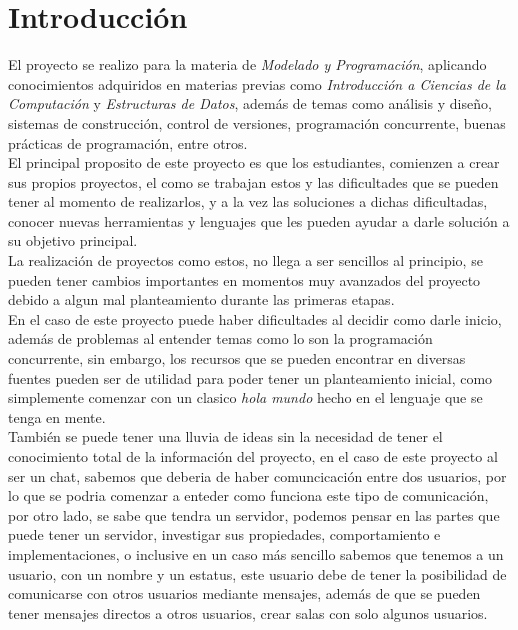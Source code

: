 \documentclass[12pt]{report}
\begin{document}
\chapter{Introducción}
El proyecto se realizo para la materia de \textit{Modelado y Programación}, aplicando conocimientos adquiridos en materias previas como \textit{Introducción a Ciencias de la Computación} y \textit{Estructuras de Datos}, además de temas como análisis y diseño, sistemas de construcción, control de versiones, programación concurrente, buenas prácticas de programación, entre otros.\\

El principal proposito de este proyecto es que los estudiantes, comienzen a crear sus propios proyectos, el como se trabajan estos y las dificultades que se pueden tener al momento de realizarlos, y a la vez las soluciones a dichas dificultadas, conocer nuevas herramientas y lenguajes que les pueden ayudar a darle solución a su objetivo principal.\\

La realización de proyectos como estos, no llega a ser sencillos al principio, se pueden tener cambios importantes en momentos muy avanzados del proyecto debido a algun mal planteamiento durante las primeras etapas.\\

En el caso de este proyecto puede haber dificultades al decidir como darle inicio, además de problemas al entender temas como lo son la programación concurrente, sin embargo, los recursos que se pueden encontrar en diversas fuentes pueden ser de utilidad para poder tener un planteamiento inicial, como simplemente comenzar con un clasico \textit{hola mundo} hecho en el lenguaje que se tenga en mente.\\

También se puede tener una lluvia de ideas sin la necesidad de tener el conocimiento total de la información del proyecto, en el caso de este proyecto al ser un chat, sabemos que deberia de haber comuncicación entre dos usuarios, por lo que se podria comenzar a enteder como funciona este tipo de comunicación, por otro lado, se sabe que tendra un servidor, podemos pensar en las partes que puede tener un servidor, investigar sus propiedades, comportamiento e implementaciones, o inclusive en un caso más sencillo sabemos que tenemos a un usuario, con un nombre y un estatus, este usuario debe de tener la posibilidad de comunicarse con otros usuarios mediante mensajes, además de que se pueden tener mensajes directos a otros usuarios, crear salas con solo algunos usuarios.\\
\end{document}
